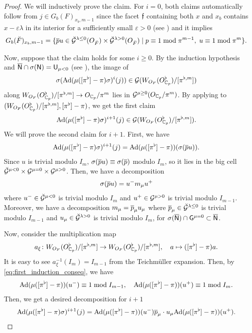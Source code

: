 \documentclass[12pt,reqno]{amsart}
\begin{document}
\begin{proof}
    We will inductively prove the claim. For $i=0$, both claims automatically follow from $j \in G_b(F)_{x_b, m - 1}$ since the facet ${\mathfrak{f}}$ containing both $x$ and $x_b$ contains $x - \varepsilon \lambda$ in its interior for a sufficiently small $\varepsilon > 0$ (see \cite[Definition 5.1]{Tak25z}) and it implies
    \[  
        G_b(\breve{F})_{x_b, m - 1} = \{ {\overline{p}}u \in {\mathcal{\breve{G}}}^{\lambda \leq 0}(O_{\breve{F}}) \times {\mathcal{\breve{G}}}^{\lambda > 0}(O_{\breve{F}}) \mid p \equiv 1 \bmod{\pi^{m-1}}, \; u \equiv 1 \bmod{\pi^{m}} \}. 
    \] 
    
    Now, suppose that the claim holds for some $i \geq 0$. By the induction hypothesis and ${\mathsf{{\overline{N}}}} \cap \sigma({\mathsf{N}}) = {\mathsf{U}}_{\mu < 0}$ (see ), the image of
    \[
        \sigma({\operatorname{Ad}}(\mu([\pi^\flat]-\pi) \sigma)^i(j)) \in {\mathcal{G}}(W_{O_F}(O_{\mathbb{C}_p}^\flat)/[\pi^{\flat, m}])
    \]
    along $W_{O_F}(O_{\mathbb{C}_p}^\flat)/[\pi^{\flat, m}] \to O_{\mathbb{C}_p} / \pi^m$ lies in ${\mathcal{G}}^{\mu \geq 0}(O_{\mathbb{C}_p}/\pi^m)$. By applying \cite[Proposition 4.2.9]{Ito25a} to $(W_{O_F}(O_{\mathbb{C}_p}^\flat)/[\pi^{\flat, m}], [\pi^\flat] - \pi)$, we get the first claim
    \begin{equation} \label{eq:first_induction_conseq}
        {\operatorname{Ad}}(\mu([\pi^\flat]-\pi) \sigma)^{i+1}(j) \in {\mathcal{G}}(W_{O_F}(O_{\mathbb{C}_p}^\flat)/[\pi^{\flat, m}]). 
    \end{equation}
    We will prove the second claim for $i+1$. First, we have
    \[
        {\operatorname{Ad}}(\mu([\pi^\flat]-\pi) \sigma)^{i+1}(j) = {\operatorname{Ad}}(\mu([\pi^\flat]-\pi))(\sigma({\overline{p}} u)). 
    \]
    Since $u$ is trivial modulo $I_m$, $\sigma({\overline{p}} u) \equiv \sigma({\overline{p}})$ modulo $I_m$, so it lies in the big cell ${\mathcal{\breve{G}}}^{\mu<0} \times {\mathcal{G}}^{\mu = 0} \times {\mathcal{G}}^{\mu>0}$. Then, we have a decomposition
    \[
        \sigma({\overline{p}} u) = u^{-} m_\mu u^+
    \]
    where $u^- \in {\mathcal{\breve{G}}}^{\mu<0}$ is trivial modulo $I_m$ and $u^+ \in {\mathcal{G}}^{\mu>0}$ is trivial modulo $I_{m-1}$. Moreover, we have a decomposition $m_\mu = {\overline{p}}_\mu u_\mu$ where ${\overline{p}}_\mu \in {\mathcal{\breve{G}}}^{\lambda \leq 0}$ is trivial modulo $I_{m-1}$ and $u_\mu \in {\mathcal{\breve{G}}}^{\lambda > 0}$ is trivial modulo $I_m$, for $\sigma({\mathsf{{\overline{N}}}}) \cap {\mathsf{G}}^{\mu = 0} \subset {\mathsf{{\overline{N}}}}$. 
    
    Now, consider the multiplication map 
    \[
        a_\xi \colon W_{O_F}(O_{\mathbb{C}_p}^\flat)/[\pi^{\flat, m}] \to W_{O_F}(O_{\mathbb{C}_p}^\flat)/[\pi^{\flat, m}] ,\quad 
        a \mapsto ([\pi^\flat] - \pi) a. 
    \]
    It is easy to see $a_\xi^{-1}(I_m) = I_{m-1}$ from the Teichm\"{u}ller expansion. Then, by \eqref{eq:first_induction_conseq}, we have
    \[
        {\operatorname{Ad}}(\mu([\pi^\flat]-\pi))(u^-) \equiv 1 \bmod{I_{m-1}} ,\quad
        {\operatorname{Ad}}(\mu([\pi^\flat]-\pi))(u^+) \equiv 1 \bmod{I_m}. 
    \]
    Then, we get a desired decomposition for $i + 1$
    \[
        {\operatorname{Ad}}(\mu([\pi^\flat]-\pi) \sigma)^{i+1}(j) = {\operatorname{Ad}}(\mu([\pi^\flat]-\pi))(u^-) {\overline{p}}_\mu \cdot u_\mu {\operatorname{Ad}}(\mu([\pi^\flat]-\pi))(u^+). 
    \]
\end{proof}
\end{document}
